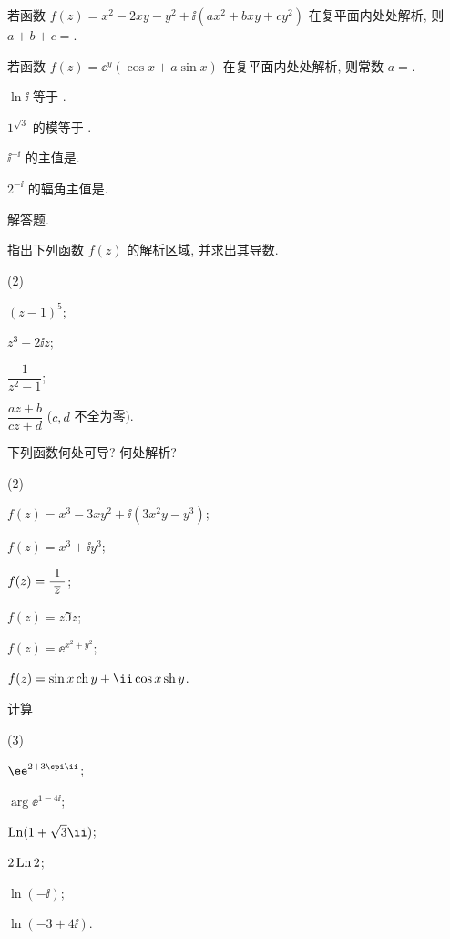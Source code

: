 \begin{homework}
\begin{homework}
    \item 若函数 $f(z)=x^2-2xy-y^2+\ii(ax^2+bxy+cy^2)$ 在复平面内处处解析, 则 $a+b+c=$\fillblank{}.
    \item 若函数 $f(z)=\ee^{y}(\cos x+a\sin x)$ 在复平面内处处解析, 则常数 $a=$\fillblank{}.
    \item $\ln \ii$ 等于 \fillblank{}.
    \item $1^{\sqrt3}$ 的模等于 \fillblank{}.
    \item $\ii^{-\ii}$ 的主值是\fillblank{}.
    \item $2^{-\ii}$ 的辐角主值是\fillblank{}.
  \end{homework}
  \item 解答题.
  \begin{homework}
    \item 指出下列函数 $f(z)$ 的解析区域, 并求出其导数.
      \begin{subhomework}(2)
        \item $(z-1)^5$;
        \item $z^3+2\ii z$;
        \item $\dfrac1{z^2-1}$;
        \item $\dfrac{az+b}{cz+d}$ ($c,d$ 不全为零).
      \end{subhomework}
    \item 下列函数何处可导? 何处解析?
      \begin{subhomework}(2)
        \item $f(z)=x^3-3xy^2+\ii(3x^2y-y^3)$;
        \item $f(z)=x^3+\ii y^3$;
        \item $f(z)=\dfrac1{~\overline z~}$;
        \item $f(z)=z\Im z$;
        \item $f(z)=\ee^{x^2+y^2}$;
        \item $f(z)=\sin x\ch y+\ii\cos x\sh y$.
      \end{subhomework}
    \item 计算
      \begin{subhomework}(3)
        \item $\ee^{2+3\cpi\ii}$;
        \item $\arg \ee^{1-4\ii}$;
        \item $\Ln(1+\sqrt3\ii)$;
        \item $2\operatorname{Ln}2$;
        \item $\ln(-\ii)$;
        \item $\ln(-3+4\ii)$.
      \end{subhomework}

\end{homework}
\end{homework}
